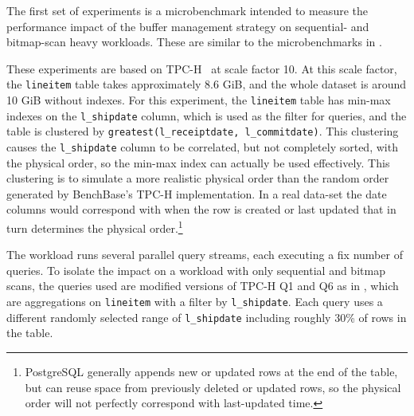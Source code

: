 The first set of experiments is a microbenchmark intended to measure the performance impact of the buffer management strategy on sequential- and bitmap-scan heavy workloads. These are similar to the microbenchmarks in \cite{pbm}. %


These experiments are based on TPC-H~\cite{tpch} at scale factor 10. At this scale factor, the \verb|lineitem| table takes approximately 8.6 GiB, and the whole dataset is around 10 GiB without indexes. For this experiment, the \verb|lineitem| table has min-max indexes on the \verb|l_shipdate| column, which is used as the filter for queries, and the table is clustered by \verb|greatest(l_receiptdate, l_commitdate)|. This clustering causes the \verb|l_shipdate| column to be correlated, but not completely sorted, with the physical order, so the min-max index can actually be used effectively. This clustering is to simulate a more realistic physical order than the random order generated by BenchBase's TPC-H implementation. In a real data-set the date columns would correspond with when the row is created or last updated that in turn determines the physical order.\footnote{PostgreSQL generally appends new or updated rows at the end of the table, but can reuse space from previously deleted or updated rows, so the physical order will not perfectly correspond with last-updated time.}

The workload runs several parallel query streams, each executing a fix number of queries. To isolate the impact on a workload with only sequential and bitmap scans, the queries used are modified versions of TPC-H Q1 and Q6 as in \cite{pbm}, which are aggregations on \verb|lineitem| with a filter by \verb|l_shipdate|. Each query uses a different randomly selected range of \verb|l_shipdate| including roughly 30\% of rows in the table.




